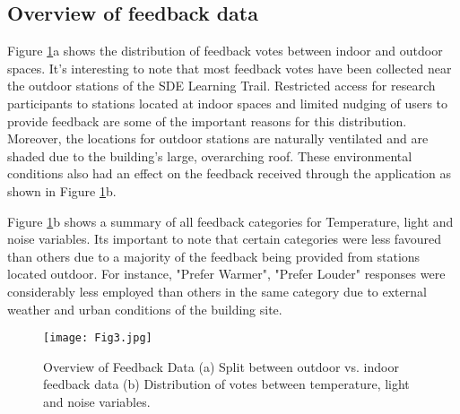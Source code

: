 

\subsection{Overview of feedback data}

Figure \ref{fig:feedbackdata}a shows the distribution of feedback votes between indoor and outdoor spaces. It's interesting to note that most feedback votes have been collected near the outdoor stations of the SDE Learning Trail. Restricted access for research participants to stations located at indoor spaces and limited nudging of users to provide feedback are some of the important reasons for this distribution. Moreover, the locations for outdoor stations are naturally ventilated and are shaded due to the building's large, overarching roof. These environmental conditions also had an effect on the feedback received through the application as shown in Figure \ref{fig:feedbackdata}b.

Figure \ref{fig:feedbackdata}b shows a summary of all feedback categories for Temperature, light and noise variables. Its important to note that certain categories were less favoured than others due to a majority of the feedback being provided from stations located outdoor. For instance, "Prefer Warmer", "Prefer Louder" responses were considerably less employed than others in the same category due to external weather and urban conditions of the building site.    



\begin{figure}
\begin{center}
\texttt{[image: Fig3.jpg]}
\caption{Overview of Feedback Data (a) Split between outdoor vs. indoor feedback data (b) Distribution of votes between temperature, light and noise variables.}
\label{fig:feedbackdata}
\end{center}
\end{figure}


